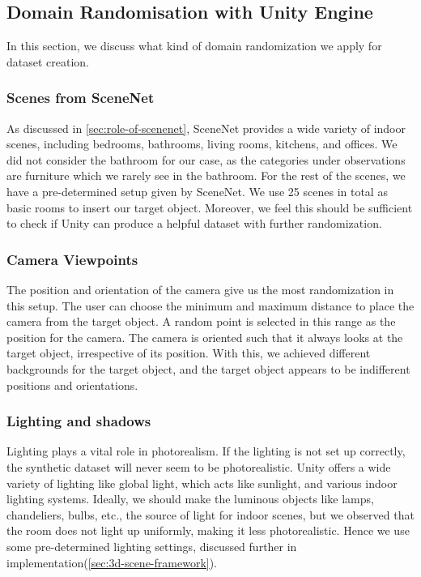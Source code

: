 \subsection{Domain Randomisation with Unity Engine}\label{subsec:domain-randomisation-with-unity-engine}
In this section, we discuss what kind of domain randomization we apply for dataset creation.

\subsubsection{Scenes from SceneNet}\label{subsubsec:scenes-from-scenenet}
As discussed in \autoref{sec:role-of-scenenet}, SceneNet provides a wide variety of indoor scenes, including bedrooms, bathrooms, living rooms, kitchens, and offices.
We did not consider the bathroom for our case, as the categories under observations are furniture which we rarely see in the bathroom.
For the rest of the scenes, we have a pre-determined setup given by SceneNet.
We use 25 scenes in total as basic rooms to insert our target object.
Moreover, we feel this should be sufficient to check if Unity can produce a helpful dataset with further randomization.

\subsubsection{Camera Viewpoints}
The position and orientation of the camera give us the most randomization in this setup.
The user can choose the minimum and maximum distance to place the camera from the target object.
A random point is selected in this range as the position for the camera.
The camera is oriented such that it always looks at the target object, irrespective of its position.
With this, we achieved different backgrounds for the target object, and the target object appears to be indifferent positions and orientations.

\subsubsection{Lighting and shadows}
Lighting plays a vital role in photorealism.
If the lighting is not set up correctly, the synthetic dataset will never seem to be photorealistic.
Unity offers a wide variety of lighting like global light, which acts like sunlight, and various indoor lighting systems.
Ideally, we should make the luminous objects like lamps, chandeliers, bulbs, etc.,
the source of light for indoor scenes, but we observed that the room does not light up uniformly,
making it less photorealistic.
Hence we use some pre-determined lighting settings, discussed further in implementation(\autoref{sec:3d-scene-framework}).

